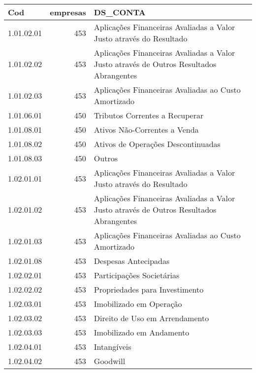 \begin{table}[ht]
\centering
\begin{tabular}{lrl}
  \hline
Cod & empresas & DS\_CONTA \\ 
  \hline
1.01.02.01 & 453 & Aplicações Financeiras Avaliadas a Valor Justo através do Resultado \\ 
  1.01.02.02 & 453 & Aplicações Financeiras Avaliadas a Valor Justo através de Outros Resultados Abrangentes \\ 
  1.01.02.03 & 453 & Aplicações Financeiras Avaliadas ao Custo Amortizado \\ 
  1.01.06.01 & 450 & Tributos Correntes a Recuperar \\ 
  1.01.08.01 & 450 & Ativos Não-Correntes a Venda \\ 
  1.01.08.02 & 450 & Ativos de Operações Descontinuadas \\ 
  1.01.08.03 & 450 & Outros \\ 
  1.02.01.01 & 453 & Aplicações Financeiras Avaliadas a Valor Justo através do Resultado \\ 
  1.02.01.02 & 453 & Aplicações Financeiras Avaliadas a Valor Justo através de Outros Resultados Abrangentes \\ 
  1.02.01.03 & 453 & Aplicações Financeiras Avaliadas ao Custo Amortizado \\ 
  1.02.01.08 & 453 & Despesas Antecipadas \\ 
  1.02.02.01 & 453 & Participações Societárias \\ 
  1.02.02.02 & 453 & Propriedades para Investimento \\ 
  1.02.03.01 & 453 & Imobilizado em Operação \\ 
  1.02.03.02 & 453 & Direito de Uso em Arrendamento \\ 
  1.02.03.03 & 453 & Imobilizado em Andamento \\ 
  1.02.04.01 & 453 & Intangíveis \\ 
  1.02.04.02 & 453 & Goodwill \\ 
   \hline
\end{tabular}
\end{table}
